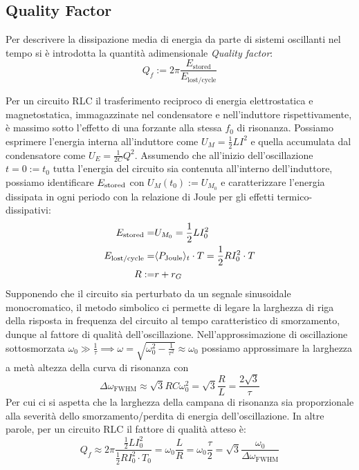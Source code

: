 \documentclass{article}[a4paper, oneside, 11pt]
\begin{document}
\subsection{Quality Factor}
Per descrivere la dissipazione media di energia da parte di sistemi oscillanti
nel tempo si è introdotta la quantità adimensionale \emph{Quality factor}:
\begin{equation}\label{eq: Qf}
	Q_f := 2\pi \frac{E_{\text{stored}}}{E_{\text{lost/cycle}}}
\end{equation}

Per un circuito RLC il trasferimento reciproco di energia elettrostatica e
magnetostatica, immagazzinate nel condensatore e nell'induttore rispettivamente,
è massimo sotto l'effetto di una forzante alla stessa $f_0$ di risonanza.
Possiamo esprimere l'energia interna all'induttore come $U_M = \frac{1}{2}LI^2$
e quella accumulata dal condensatore come $U_E = \frac{1}{2C}Q^2$.
Assumendo che all'inizio dell'oscillazione $t = 0 := t_0$ tutta l'energia del
circuito sia contenuta all'interno dell'induttore, possiamo identificare
$E_{\rm stored}$ con $U_M(t_0) := U_{M_0}$ e caratterizzare l'energia dissipata
in ogni periodo con la relazione di Joule per gli effetti termico-dissipativi:
\begin{align}
	E_{\text{stored}} =& U_{M_0} = \frac{1}{2} LI_0^2 \\
	E_{\text{lost/cycle}} =& \langle P_{\rm Joule} \rangle_t \cdot T = 
	\frac{1}{2} RI_0^2 \cdot T\\
	R :=& r + r_G 
\end{align}
Supponendo che il circuito sia perturbato da un segnale sinusoidale
monocromatico, il metodo simbolico ci permette di legare la larghezza di riga
della risposta in frequenza del circuito al tempo caratteristico di
smorzamento, dunque al fattore di qualità dell'oscillazione.
Nell'approssimazione di oscillazione sottosmorzata $\omega_0 \gg \frac{1}{\tau}
\implies \omega = \sqrt{\omega_0^2 - \frac{1}{\tau^2}} \approx \omega_0$
possiamo approssimare la larghezza a metà altezza della curva di risonanza con 
\begin{equation}\label{eq: FWHM}
	\Delta \omega_{\text{FWHM}}	\approx \sqrt{3} RC \omega_0^2 = 
	\sqrt{3} \frac{R}{L} = \frac{2 \sqrt{3}}{\tau} 
\end{equation}
Per cui ci si aspetta che la larghezza della campana di risonanza sia
proporzionale alla severità dello smorzamento/perdita di energia
dell'oscillazione.
In altre parole, per un circuito RLC il fattore di qualità atteso è:
\begin{equation}\label{eq: QfFWHM}
	Q_f \approx 2\pi \frac{\frac{1}{2}L I_0^2}{\frac{1}{2}R I_0^2 \cdot T_0}
	= \omega_0 \frac{L}{R} = \omega_0 \frac{\tau}{2} 
	= \sqrt{3} \frac{\omega_0}{\Delta \omega_{\text{FWHM}}} 
\end{equation}
\end{document}
